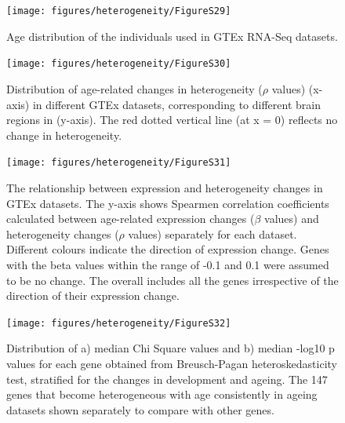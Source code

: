 \documentclass[12pt,twoside]{unicam}
\begin{document}
\begin{figure}

{\centering \texttt{[image: figures/heterogeneity/FigureS29]} 

}

\caption[Age distribution of the individuals used in GTEx RNA-seq datasets.]{Age distribution of the individuals used in GTEx RNA-Seq datasets.}\label{fig:hetFigS29}
\end{figure}

\begin{figure}

{\centering \texttt{[image: figures/heterogeneity/FigureS30]} 

}

\caption[Distribution of age-related changes in heterogeneity ($\rho$ values) in different GTEx datasets, corresponding to different brain regions.]{Distribution of age-related changes in heterogeneity ($\rho$ values) (x-axis) in different GTEx datasets, corresponding to different brain regions in (y-axis). The red dotted vertical line (at x = 0) reflects no change in heterogeneity. }\label{fig:hetFigS30}
\end{figure}

\begin{figure}

{\centering \texttt{[image: figures/heterogeneity/FigureS31]} 

}

\caption[The relationship between expression and heterogeneity changes in GTEx datasets.]{The relationship between expression and heterogeneity changes in GTEx datasets. The y-axis shows Spearmen correlation coefficients calculated between age-related expression changes ($\beta$ values) and heterogeneity changes ($\rho$ values) separately for each dataset. Different colours indicate the direction of expression change. Genes with the beta values within the range of -0.1 and 0.1 were assumed to be no change. The overall includes all the genes irrespective of the direction of their expression change.}\label{fig:hetFigS31}
\end{figure}

\begin{figure}

{\centering \texttt{[image: figures/heterogeneity/FigureS32]} 

}

\caption[Confirmation of the results using Breusch-Pagan test.]{Distribution of a) median Chi Square values and b) median -log10 p values for each gene obtained from Breusch-Pagan heteroskedasticity test, stratified for the changes in development and ageing. The 147 genes that become heterogeneous with age consistently in ageing datasets shown  separately to compare with other genes.}\label{fig:hetFigS32}
\end{figure}
\end{document}

